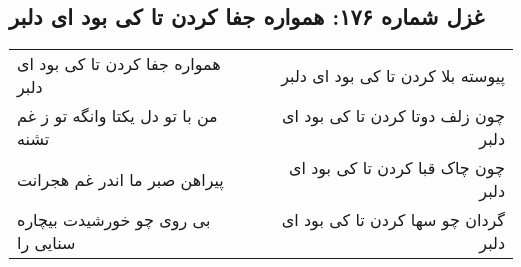 \begin{center}
\section*{غزل شماره ۱۷۶: همواره جفا کردن تا کی بود ای دلبر}
\label{sec:176}
\begin{longtable}{l p{0.5cm} r}
همواره جفا کردن تا کی بود ای دلبر
&&
پیوسته بلا کردن تا کی بود ای دلبر
\\
من با تو دل یکتا وانگه تو ز غم تشنه
&&
چون زلف دوتا کردن تا کی بود ای دلبر
\\
پیراهن صبر ما اندر غم هجرانت
&&
چون چاک قبا کردن تا کی بود ای دلبر
\\
بی روی چو خورشیدت بیچاره سنایی را
&&
گردان چو سها کردن تا کی بود ای دلبر
\\
\end{longtable}
\end{center}

